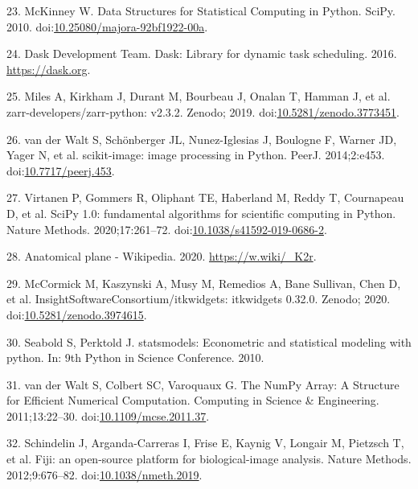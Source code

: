 \documentclass[
  american,
]{article}
\newenvironment{cslreferences}%
  {}%
  {\par}
\begin{document}
\begin{cslreferences}
\leavevmode\hypertarget{ref-U5AcoDOX}{}%
23. McKinney W. Data Structures for Statistical Computing in Python. SciPy. 2010. doi:\href{https://doi.org/10.25080/majora-92bf1922-00a}{10.25080/majora-92bf1922-00a}.

\leavevmode\hypertarget{ref-hj1CnyWB}{}%
24. Dask Development Team. Dask: Library for dynamic task scheduling. 2016. \url{https://dask.org}.

\leavevmode\hypertarget{ref-10Fk3ASPz}{}%
25. Miles A, Kirkham J, Durant M, Bourbeau J, Onalan T, Hamman J, et al. zarr-developers/zarr-python: v2.3.2. Zenodo; 2019. doi:\href{https://doi.org/10.5281/zenodo.3773451}{10.5281/zenodo.3773451}.

\leavevmode\hypertarget{ref-stvWEJeu}{}%
26. van der Walt S, Schönberger JL, Nunez-Iglesias J, Boulogne F, Warner JD, Yager N, et al. scikit-image: image processing in Python. PeerJ. 2014;2:e453. doi:\href{https://doi.org/10.7717/peerj.453}{10.7717/peerj.453}.

\leavevmode\hypertarget{ref-8Miti2Gz}{}%
27. Virtanen P, Gommers R, Oliphant TE, Haberland M, Reddy T, Cournapeau D, et al. SciPy 1.0: fundamental algorithms for scientific computing in Python. Nature Methods. 2020;17:261--72. doi:\href{https://doi.org/10.1038/s41592-019-0686-2}{10.1038/s41592-019-0686-2}.

\leavevmode\hypertarget{ref-ydSnvH5h}{}%
28. Anatomical plane - Wikipedia. 2020. \url{https://w.wiki/_K2r}.

\leavevmode\hypertarget{ref-v85zR2Z2}{}%
29. McCormick M, Kaszynski A, Musy M, Remedios A, Bane Sullivan, Chen D, et al. InsightSoftwareConsortium/itkwidgets: itkwidgets 0.32.0. Zenodo; 2020. doi:\href{https://doi.org/10.5281/zenodo.3974615}{10.5281/zenodo.3974615}.

\leavevmode\hypertarget{ref-E4OYV0qi}{}%
30. Seabold S, Perktold J. statsmodels: Econometric and statistical modeling with python. In: 9th Python in Science Conference. 2010.

\leavevmode\hypertarget{ref-OiM2HfsY}{}%
31. van der Walt S, Colbert SC, Varoquaux G. The NumPy Array: A Structure for Efficient Numerical Computation. Computing in Science \& Engineering. 2011;13:22--30. doi:\href{https://doi.org/10.1109/mcse.2011.37}{10.1109/mcse.2011.37}.

\leavevmode\hypertarget{ref-Fkmz2cmo}{}%
32. Schindelin J, Arganda-Carreras I, Frise E, Kaynig V, Longair M, Pietzsch T, et al. Fiji: an open-source platform for biological-image analysis. Nature Methods. 2012;9:676--82. doi:\href{https://doi.org/10.1038/nmeth.2019}{10.1038/nmeth.2019}.


\end{cslreferences}
\end{document}
